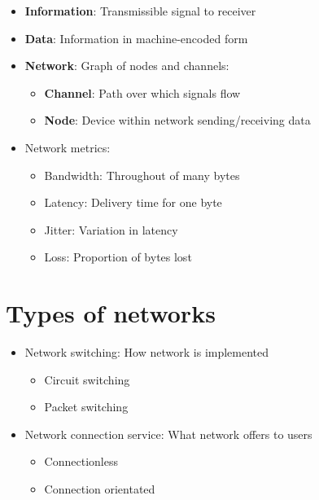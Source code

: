 \documentclass[conference]{IEEEtran}
\begin{document}
\begin{itemize}
    \item \textbf{Information}: Transmissible signal to receiver 
    \item \textbf{Data}: Information in machine-encoded form
    \item \textbf{Network}: Graph of nodes and channels:
    \begin{itemize}
        \item \textbf{Channel}: Path over which signals flow 
        \item \textbf{Node}: Device within network sending/receiving data 
    \end{itemize}
    \item Network metrics:
    \begin{itemize}
        \item Bandwidth: Throughout of many bytes 
        \item Latency: Delivery time for one byte 
        \item Jitter: Variation in latency 
        \item Loss: Proportion of bytes lost 
    \end{itemize}
\end{itemize}

\pagebreak
\section{\textbf{Types of networks}}

\begin{itemize}
    \item Network switching: How network is implemented
    \begin{itemize}
        \item Circuit switching 
        \item Packet switching
    \end{itemize}
    \item Network connection service: What network offers to users
    \begin{itemize}
        \item Connectionless 
        \item Connection orientated
    \end{itemize}
\end{itemize}

\end{document}
